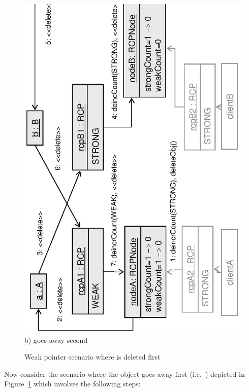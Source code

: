 \documentclass[pdf,ps2pdf,11pt]{SANDreport}
\begin{document}
{\begin{figure}
\begin{center}
\includegraphics*[angle=270,scale=0.65]{CircularRCP_A_B_ClientB_2}
\\[2ex] b) {} goes away second \\[3ex]
\end{center}
\caption{
\label{fig:CircularRCP_A_B_ClientB}
Weak pointer scenario where {} is deleted first  }
\end{figure}
\esinglespace}


Now consider the scenario where the {} object goes away
first (i.e.\ {}) depicted in
Figure~\ref{fig:CircularRCP_A_B_ClientB} which involves the following
steps:
\end{document}

